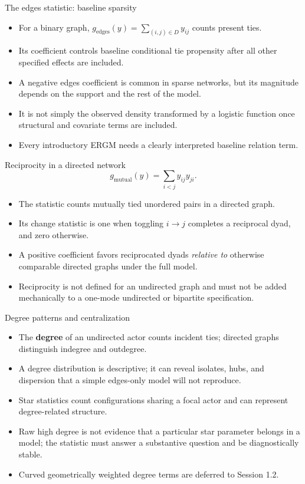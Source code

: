 \documentclass[aspectratio=169,11pt]{beamer}
\newcommand{\term}[1]{\textbf{\color{nupurple}#1}}
\begin{document}
\begin{frame}{The edges statistic: baseline sparsity}
\begin{itemize}
\item For a binary graph, $g_{\mathrm{edges}}(y)=\sum_{(i,j)\in D}y_{ij}$ counts present ties.
\item Its coefficient controls baseline conditional tie propensity after all other specified effects are included.
\item A negative edges coefficient is common in sparse networks, but its magnitude depends on the support and the rest of the model.
\item It is not simply the observed density transformed by a logistic function once structural and covariate terms are included.
\item Every introductory ERGM needs a clearly interpreted baseline relation term.
\end{itemize}
\end{frame}

\begin{frame}{Reciprocity in a directed network}
\[
g_{\mathrm{mutual}}(y)=\sum_{i<j}y_{ij}y_{ji}.
\]
\begin{itemize}
\item The statistic counts mutually tied unordered pairs in a directed graph.
\item Its change statistic is one when toggling $i\to j$ completes a reciprocal dyad, and zero otherwise.
\item A positive coefficient favors reciprocated dyads \emph{relative to} otherwise comparable directed graphs under the full model.
\item Reciprocity is not defined for an undirected graph and must not be added mechanically to a one-mode undirected or bipartite specification.
\end{itemize}
\end{frame}

\begin{frame}{Degree patterns and centralization}
\begin{itemize}
\item The \term{degree} of an undirected actor counts incident ties; directed graphs distinguish indegree and outdegree.
\item A degree distribution is descriptive; it can reveal isolates, hubs, and dispersion that a simple edges-only model will not reproduce.
\item Star statistics count configurations sharing a focal actor and can represent degree-related structure.
\item Raw high degree is not evidence that a particular star parameter belongs in a model; the statistic must answer a substantive question and be diagnostically stable.
\item Curved geometrically weighted degree terms are deferred to Session 1.2.
\end{itemize}
\end{frame}
\end{document}
